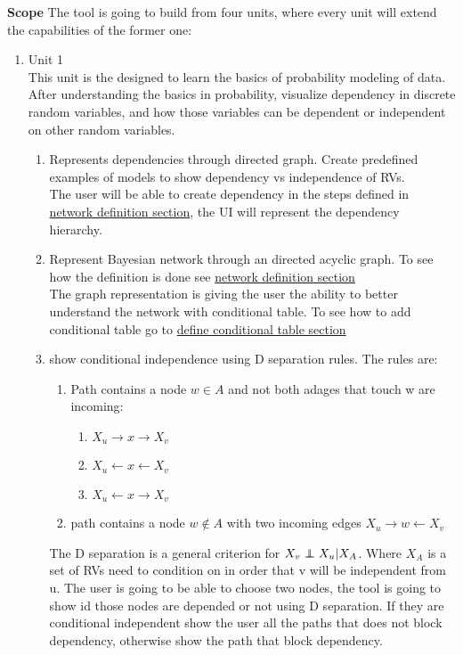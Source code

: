 \documentclass{article}
\newcommand\independent{\protect\mathpalette{\protect\independenT}{\perp}}
\def\independenT#1#2{\mathrel{\rlap{$#1#2$}\mkern2mu{#1#2}}}
\begin{document}
    \textbf{Scope}
    The tool is going to build from four units, where every unit will extend the capabilities of the former one:
    \begin{enumerate}
        \item Unit 1\\
        This unit is the designed to learn the basics of probability modeling of data. After understanding the basics in probability, visualize
        dependency in discrete random variables, and how those variables can be dependent or independent on other random variables.
        \begin{enumerate}
            \item Represents dependencies through directed graph. Create predefined examples of models to show dependency vs independence of RVs.\\
            The user will be able to create dependency in the steps defined in \hyperlink{network_defeniton}{network definition section}, the UI will represent the dependency hierarchy.
            \item Represent Bayesian network through an directed acyclic graph. To see how the definition is done see \hyperlink{network_defeniton}{network definition section}\\
            The graph representation is giving the user the ability to better understand the network with conditional table. To see how to add conditional table go to \hyperlink{define conditional table}{define conditional table section}
            \item show conditional independence using D separation rules. The rules are:\\
            \begin{enumerate}
                \item Path contains a node $w \in A$ and not both adages that touch w are incoming:
                \begin{enumerate}
                    \item $X_u \rightarrow x \rightarrow X_v$
                    \item $X_u \leftarrow x \leftarrow X_v$
                    \item $X_u \leftarrow x \rightarrow X_v$
                \end{enumerate}
                \item path contains a node $w\notin A$ with two incoming edges $X_u \rightarrow w \leftarrow X_v$
            \end{enumerate}
            The D separation is a general criterion for $X_v \independent X_u | X_A$. Where $X_A$ is a set of RVs need to condition on in order that v will be independent
            from u.
            The user is going to be able to choose two nodes, the tool is going to show id those nodes are depended or not using D separation. If they are conditional
            independent show the user all the paths that does not block dependency, otherwise show the path that block dependency.\\
        \end{enumerate}


\end{enumerate}
\end{document}
